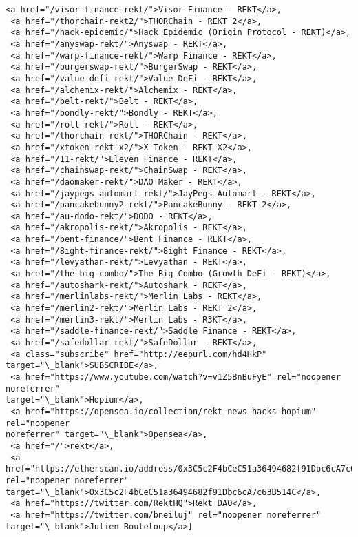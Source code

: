 \documentclass[11pt]{article}
\begin{document}
\begin{tcolorbox}[breakable, size=fbox, boxrule=.5pt, pad at break*=1mm, opacityfill=0]
\begin{Verbatim}[commandchars=\\\{\}]
 <a href="/visor-finance-rekt/">Visor Finance - REKT</a>,
 <a href="/thorchain-rekt2/">THORChain - REKT 2</a>,
 <a href="/hack-epidemic/">Hack Epidemic (Origin Protocol - REKT)</a>,
 <a href="/anyswap-rekt/">Anyswap - REKT</a>,
 <a href="/warp-finance-rekt/">Warp Finance - REKT</a>,
 <a href="/burgerswap-rekt/">BurgerSwap - REKT</a>,
 <a href="/value-defi-rekt/">Value DeFi - REKT</a>,
 <a href="/alchemix-rekt/">Alchemix - REKT</a>,
 <a href="/belt-rekt/">Belt - REKT</a>,
 <a href="/bondly-rekt/">Bondly - REKT</a>,
 <a href="/roll-rekt/">Roll - REKT</a>,
 <a href="/thorchain-rekt/">THORChain - REKT</a>,
 <a href="/xtoken-rekt-x2/">X-Token - REKT X2</a>,
 <a href="/11-rekt/">Eleven Finance - REKT</a>,
 <a href="/chainswap-rekt/">ChainSwap - REKT</a>,
 <a href="/daomaker-rekt/">DAO Maker - REKT</a>,
 <a href="/jaypegs-automart-rekt/">JayPegs Automart - REKT</a>,
 <a href="/pancakebunny2-rekt/">PancakeBunny - REKT 2</a>,
 <a href="/au-dodo-rekt/">DODO - REKT</a>,
 <a href="/akropolis-rekt/">Akropolis - REKT</a>,
 <a href="/bent-finance/">Bent Finance - REKT</a>,
 <a href="/8ight-finance-rekt/">8ight Finance - REKT</a>,
 <a href="/levyathan-rekt/">Levyathan - REKT</a>,
 <a href="/the-big-combo/">The Big Combo (Growth DeFi - REKT)</a>,
 <a href="/autoshark-rekt/">Autoshark - REKT</a>,
 <a href="/merlinlabs-rekt/">Merlin Labs - REKT</a>,
 <a href="/merlin2-rekt/">Merlin Labs - REKT 2</a>,
 <a href="/merlin3-rekt/">Merlin Labs - R3KT</a>,
 <a href="/saddle-finance-rekt/">Saddle Finance - REKT</a>,
 <a href="/safedollar-rekt/">SafeDollar - REKT</a>,
 <a class="subscribe" href="http://eepurl.com/hd4HkP"
target="\_blank">SUBSCRIBE</a>,
 <a href="https://www.youtube.com/watch?v=v1Z5BnBuFyE" rel="noopener noreferrer"
target="\_blank">Hopium</a>,
 <a href="https://opensea.io/collection/rekt-news-hacks-hopium" rel="noopener
noreferrer" target="\_blank">Opensea</a>,
 <a href="/">rekt</a>,
 <a
href="https://etherscan.io/address/0x3C5c2F4bCeC51a36494682f91Dbc6cA7c63B514C"
rel="noopener noreferrer"
target="\_blank">0x3C5c2F4bCeC51a36494682f91Dbc6cA7c63B514C</a>,
 <a href="https://twitter.com/RektHQ">Rekt DAO</a>,
 <a href="https://twitter.com/bneiluj" rel="noopener noreferrer"
target="\_blank">Julien Bouteloup</a>]
\end{Verbatim}
\end{tcolorbox}
        
\end{document}
